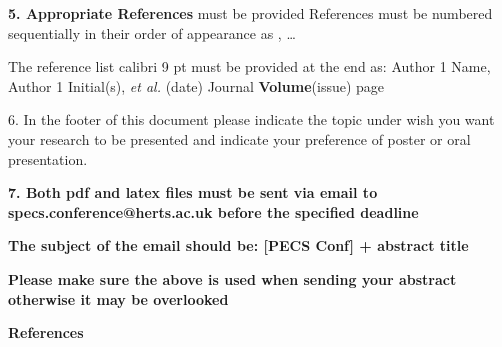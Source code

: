 \documentclass[british]{article}
\begin{document}
\textbf{5. Appropriate References} must be provided References must be numbered sequentially in their order of appearance as \cite{article1}, \cite{article2}…

The reference list calibri 9 pt must be provided at the end as: \cite{article1} Author 1 Name, Author 1 Initial(s), \textit{et al.} (date) Journal \textbf{Volume}(issue) page

6. In the footer of this document please indicate the topic under wish you want your research to be presented and indicate your preference of poster or oral presentation.

\textbf{7. Both pdf and latex files must be sent via email to specs.conference@herts.ac.uk before the specified deadline}

\textbf{The subject of the email should be: [PECS Conf] + abstract title}

\textbf{Please make sure the above is used when sending your abstract otherwise it may be overlooked }


\vspace{3mm}
\textbf{References}
\printbibliography[heading=none]


\end{document}
